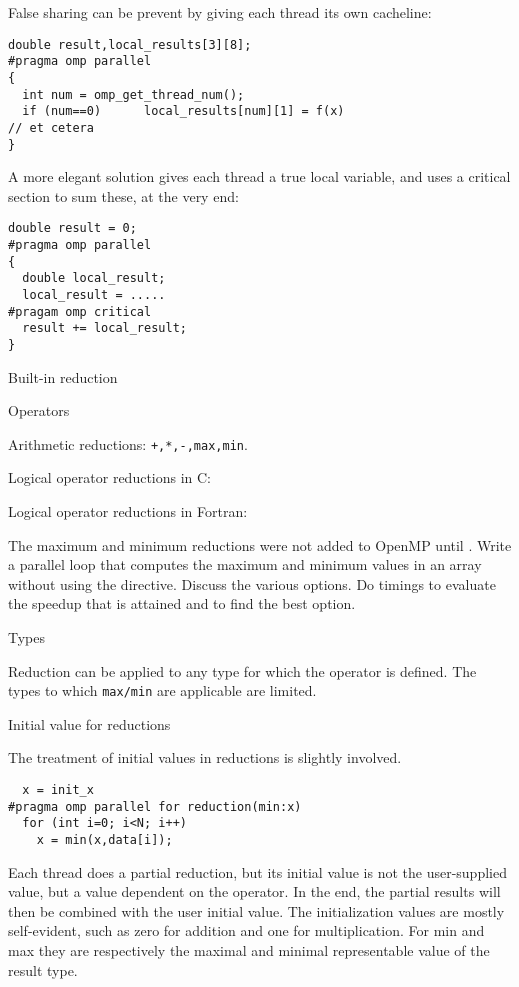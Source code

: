 False sharing can be prevent by giving each thread its own cacheline:
\begin{lstlisting}
double result,local_results[3][8];
#pragma omp parallel
{
  int num = omp_get_thread_num();
  if (num==0)      local_results[num][1] = f(x)
// et cetera
}
\end{lstlisting}
A more elegant solution gives each thread a true local variable,
and uses a critical section to sum these, at the very end:
\begin{lstlisting}
double result = 0;
#pragma omp parallel
{
  double local_result;
  local_result = .....
#pragam omp critical
  result += local_result;
}
\end{lstlisting}

 {Built-in reduction}

 {Operators}

Arithmetic reductions: \lstinline{+,*,-,max,min}.

Logical operator reductions in C: \n{& && | || ^}

Logical operator reductions in Fortran:

\begin{exercise}
  The maximum and minimum reductions were not added to OpenMP until
  .
  Write a parallel loop that computes the maximum and
  minimum values in an array without using the  directive.
  Discuss the various options. Do timings
  to evaluate the speedup that is attained and to find the best option.
\end{exercise}

 {Types}

Reduction can be applied to any type for which the operator is defined.
The types to which \lstinline{max/min} are applicable are limited.

 {Initial value for reductions}

The treatment of initial values in reductions is slightly involved.
\begin{lstlisting}
  x = init_x
#pragma omp parallel for reduction(min:x)
  for (int i=0; i<N; i++)
    x = min(x,data[i]);
\end{lstlisting}
Each thread does a partial reduction, but its initial value is not the
user-supplied  value, but a value dependent on the
operator. In the end, the partial results will then be combined with
the user initial value.
The initialization values are mostly self-evident, such as zero for
addition and one for multiplication. For min and max they are
respectively the maximal and minimal representable value of the result type.


